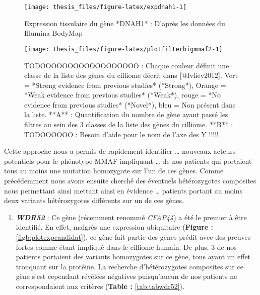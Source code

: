 \documentclass[12pt,twoside]{reedthesis}
\providecommand{\tightlist}{%
  \setlength{\itemsep}{0pt}\setlength{\parskip}{0pt}}
\theoremstyle{definition}
\theoremstyle{definition}
\theoremstyle{remark}
\begin{document}
  \begin{figure}
  
  {\centering \texttt{[image: thesis\_files/figure-latex/expdnah1-1]} 
  
  }
  
  \caption[Expression tissulaire du gène *DNAH1*]{Expression tissulaire du gène *DNAH1* : D'après les données du Illumina BodyMap}\label{fig:expdnah1}
  \end{figure}
  
  \newpage
  
  \begin{figure}
  
  {\centering \texttt{[image: thesis\_files/figure-latex/plotfilterbigmmaf2-1]} 
  
  }
  
  \caption[TODOOOOOOOOOOOOOOOOOO]{TODOOOOOOOOOOOOOOOOOO : Chaque couleur définit une classe de la liste des gènes du cilliome décrit dans [@Ivliev2012]. Vert = *Strong evidence from previous studies* (*Strong*), Orange = *Weak evidence from previous studies* (*Weak*), rouge = *No evidence from previous studies* (*Novel*), bleu = Non présent dans la liste. **A** : Quantification du nombre de gène ayant passé les filtres au sein des 3 classes de la liste des gènes du cilliome. **B** : TODOOOOOO : Besoin d'aide pour le nom de l'axe des Y !!!!!}\label{fig:plotfilterbigmmaf2}
  \end{figure}
  
  \newpage
  
  Cette approche nous a permis de rapidement identifier \ldots{} nouveaux
  acteurs potentiels pour le phénotype MMAF impliquant \ldots{} de nos
  patients qui portaient tous au moins une mutation homozygote sur l'un de
  ces gènes. Comme précédemment nous avons ensuite cherché des éventuels
  hétérozygotes composites nous permettant ainsi mettant ainsi en évidence
  \ldots{} patients portant au moins deux variants hétérozygotes
  différents sur un de ces gènes.
  
  \begin{enumerate}
  \def\labelenumi{\arabic{enumi}.}
  \tightlist
  \item
    \textbf{\emph{WDR52}} : Ce gène (récemment renommé \emph{CFAP44}) a
    été le premier à être identifié. En effet, malgrès une expression
    ubiquitaire (\textbf{Figure : }\ref{figb:plotexpcandidat}), ce gène
    fait partie des gènes prédit avec des preuves fortes comme étant
    impliqué dans le cilliome humain. De plus, 3 de nos patients portaient
    des variants homozygotes sur ce gène, tous ayant un effet tronquant
    sur la protéine. La recherche d'hétérozygotes composites sur ce gène
    s'est cependant révélées négatives puisqu'aucun de nos patients ne
    correspondaient aux critères (\textbf{Table : }\ref{tab:tabwdr52}).
  \end{enumerate}
  
\end{document}
